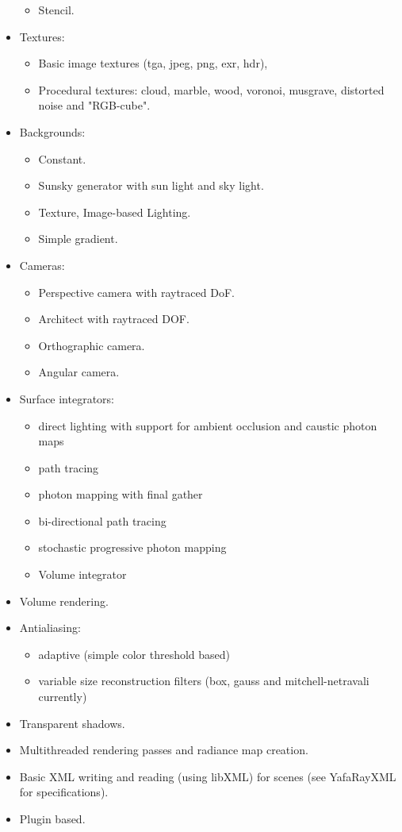 \begin{itemize}
\begin{itemize}
\item Stencil.
\end{itemize} 
\item Textures:
\begin{itemize} 
\item Basic image textures (tga, jpeg, png, exr, hdr),
\item Procedural textures: cloud, marble, wood, voronoi, musgrave, distorted noise and "RGB-cube".
\end{itemize} 
\item Backgrounds:
\begin{itemize}
\item Constant.
\item Sunsky generator with sun light and sky light.
\item Texture, Image-based Lighting.
\item Simple gradient.
\end{itemize} 
\item Cameras:
\begin{itemize} 
\item Perspective camera with raytraced DoF.
\item Architect with raytraced DOF.
\item Orthographic camera.
\item Angular camera.
\end{itemize} 
\item Surface integrators:
\begin{itemize} 
\item direct lighting with support for ambient occlusion and caustic photon maps
\item path tracing
\item photon mapping with final gather
\item bi-directional path tracing
\item stochastic progressive photon mapping
\item Volume integrator
\end{itemize} 
\item Volume rendering.
\item Antialiasing:
\begin{itemize}
\item adaptive (simple color threshold based)
\item variable size reconstruction filters (box, gauss and mitchell-netravali currently)
\end{itemize} 
\item Transparent shadows.
\item Multithreaded rendering passes and radiance map creation.
\item Basic XML writing and reading (using libXML) for scenes (see YafaRayXML for specifications).
\item Plugin based.
\end{itemize}

